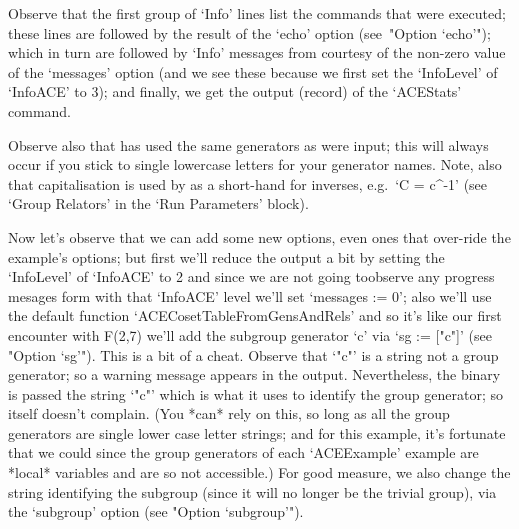 Observe that the first group of `Info' lines list  the  commands  that
were executed; these lines are followed by the result  of  the  `echo'
option (see~"Option `echo'"); which in turn  are  followed  by  `Info'
messages from {\ACE} courtesy of the non-zero value of the  `messages'
option (and we see these because  we  first  set  the  `InfoLevel'  of
`InfoACE' to 3); and finally,  we  get  the  output  (record)  of  the
`ACEStats' command.

Observe also that {\ACE} has used the same generators as  were  input;
this will always occur if you stick to single  lowercase  letters  for
your generator names. Note, also that capitalisation is used by {\ACE}
as a short-hand for inverses, e.g.~`C = c^-1' (see `Group Relators' in
the {\ACE} \lq{}Run Parameters' block).

Now let's observe that we can add some new  options,  even  ones  that
over-ride the example's options; but first we'll reduce the  output  a
bit by setting the `InfoLevel' of `InfoACE' to 2 and since we are  not
going toobserve any progress mesages form {\ACE} with  that  `InfoACE'
level we'll set `messages := 0'; also we'll use the  default  function
`ACECosetTableFromGensAndRels' and so it's like  our  first  encounter
with F(2,7) we'll add the subgroup generator `c'  via  `sg  :=  ["c"]'
(see "Option `sg'"). This is a bit of a cheat. Observe that `"c"' is a
string not a {\GAP} group generator; so a warning message  appears  in
the output. Nevertheless, the {\ACE} binary is passed the string `"c"'
which is what it uses to  identify  the  {\GAP}  group  generator;  so
{\ACE} itself doesn't complain. (You *can* rely on this,  so  long  as
all the {\GAP} group generators are single lower case letter  strings;
and for this example, it's fortunate that we  could  since  the  group
generators of each `ACEExample' example are *local* variables and  are
so not accessible.) For  good  measure,  we  also  change  the  string
identifying the subgroup (since it  will  no  longer  be  the  trivial
group), via the `subgroup' option (see "Option `subgroup'").


